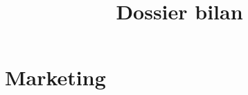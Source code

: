\documentclass[a4paper]{TPInsa}
\title{Dossier bilan}
\begin{document}
	\pageTitre
	\tableMatieres
	\chapter{Marketing}

	
	
	
	
\end{document}
